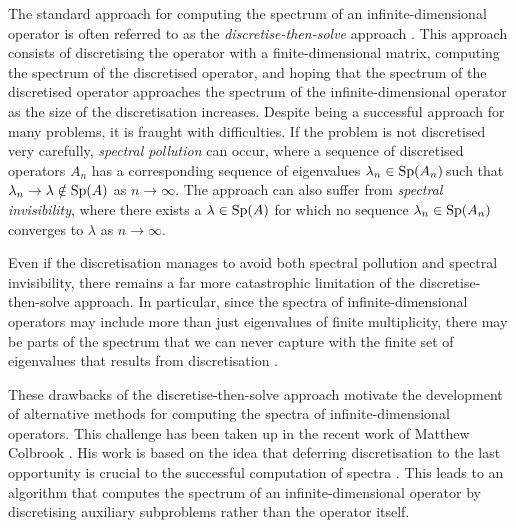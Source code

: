 The standard approach for computing the spectrum of an infinite-dimensional operator is often referred to as the \textit{discretise-then-solve} approach \cite[Chapter~1]{Matt}. 
This approach consists of discretising the operator with a finite-dimensional matrix, computing the spectrum of the discretised operator, and hoping that the spectrum of the discretised operator approaches the spectrum of the infinite-dimensional operator as the size of the discretisation increases. Despite being a successful approach for many problems, it is fraught with difficulties. If the problem is not discretised very carefully, \textit{spectral pollution} can occur, where a sequence of discretised operators $A_n$ has a corresponding sequence of eigenvalues $\lambda_n \in \operatorname{Sp}\!\left(A_n\right)\!$ such that $ \lambda_n \rightarrow \lambda \notin \operatorname{Sp}\!\left(A\right)$ as $n \rightarrow \infty.$
The approach can also suffer from \textit{spectral invisibility}, where 
there exists a $\lambda \in \operatorname{Sp}\!\left(A\right)$ for which no sequence $\lambda_n \in \operatorname{Sp}\!\left(A_n\right)$ converges to $\lambda$ as $n \rightarrow \infty.$

Even if the discretisation manages to avoid both spectral pollution and spectral invisibility, there remains a far more catastrophic limitation of the discretise-then-solve approach. In particular, since the spectra of infinite-dimensional operators may include more than just eigenvalues of finite multiplicity, there may be parts of the spectrum that we can never capture with the finite set of eigenvalues that results from discretisation \cite[Section~1.1]{Matt}. 


These drawbacks of the discretise-then-solve approach motivate the development of alternative methods for computing the spectra of infinite-dimensional operators. This challenge has been taken up in the recent work of Matthew Colbrook \cite{Matt}. 
His work is based on the idea that deferring discretisation to the last opportunity is crucial to the successful computation of spectra \cite{Forward}. This leads to an algorithm that computes the spectrum of an infinite-dimensional operator by discretising auxiliary subproblems rather than the operator itself.

